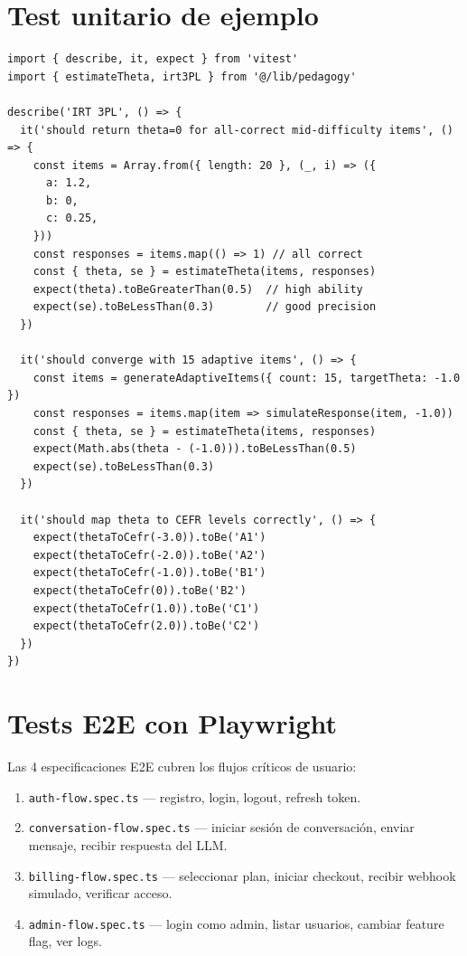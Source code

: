 \documentclass[10pt,a4paper,oneside]{report}
\begin{document}
\section{Test unitario de ejemplo}

\begin{lstlisting}[style=ts,caption={Test unitario para IRT 3PL}]
import { describe, it, expect } from 'vitest'
import { estimateTheta, irt3PL } from '@/lib/pedagogy'

describe('IRT 3PL', () => {
  it('should return theta=0 for all-correct mid-difficulty items', () => {
    const items = Array.from({ length: 20 }, (_, i) => ({
      a: 1.2,
      b: 0,
      c: 0.25,
    }))
    const responses = items.map(() => 1) // all correct
    const { theta, se } = estimateTheta(items, responses)
    expect(theta).toBeGreaterThan(0.5)  // high ability
    expect(se).toBeLessThan(0.3)        // good precision
  })

  it('should converge with 15 adaptive items', () => {
    const items = generateAdaptiveItems({ count: 15, targetTheta: -1.0 })
    const responses = items.map(item => simulateResponse(item, -1.0))
    const { theta, se } = estimateTheta(items, responses)
    expect(Math.abs(theta - (-1.0))).toBeLessThan(0.5)
    expect(se).toBeLessThan(0.3)
  })

  it('should map theta to CEFR levels correctly', () => {
    expect(thetaToCefr(-3.0)).toBe('A1')
    expect(thetaToCefr(-2.0)).toBe('A2')
    expect(thetaToCefr(-1.0)).toBe('B1')
    expect(thetaToCefr(0)).toBe('B2')
    expect(thetaToCefr(1.0)).toBe('C1')
    expect(thetaToCefr(2.0)).toBe('C2')
  })
})
\end{lstlisting}

\section{Tests E2E con Playwright}
Las 4 especificaciones E2E cubren los flujos críticos de usuario:

\begin{enumerate}[leftmargin=1.6em]
\item \texttt{auth-flow.spec.ts} — registro, login, logout, refresh token.
\item \texttt{conversation-flow.spec.ts} — iniciar sesión de conversación, enviar mensaje, recibir respuesta del LLM.
\item \texttt{billing-flow.spec.ts} — seleccionar plan, iniciar checkout, recibir webhook simulado, verificar acceso.
\item \texttt{admin-flow.spec.ts} — login como admin, listar usuarios, cambiar feature flag, ver logs.
\end{enumerate}
\end{document}
